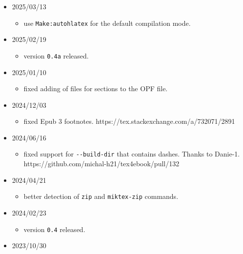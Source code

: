 \begin{itemize}
  \begin{itemize}
  \tightlist
  \item
    redefine \texttt{\textbackslash{}title} and
    \texttt{\textbackslash{}author} after the document class is loaded.
    https://github.com/michal-h21/tex4ebook/issues/138
  \end{itemize}
\item
  2025/03/13

  \begin{itemize}
  \tightlist
  \item
    use \texttt{Make:autohlatex} for the default compilation mode.
  \end{itemize}
\item
  2025/02/19

  \begin{itemize}
  \tightlist
  \item
    version \texttt{0.4a} released.
  \end{itemize}
\item
  2025/01/10

  \begin{itemize}
  \tightlist
  \item
    fixed adding of files for sections to the OPF file.
  \end{itemize}
\item
  2024/12/03

  \begin{itemize}
  \tightlist
  \item
    fixed Epub 3 footnotes. https://tex.stackexchange.com/a/732071/2891
  \end{itemize}
\item
  2024/06/16

  \begin{itemize}
  \tightlist
  \item
    fixed support for \texttt{-\/-build-dir} that contains dashes.
    Thanks to Danie-1. https://github.com/michal-h21/tex4ebook/pull/132
  \end{itemize}
\item
  2024/04/21

  \begin{itemize}
  \tightlist
  \item
    better detection of \texttt{zip} and \texttt{miktex-zip} commands.
  \end{itemize}
\item
  2024/02/23

  \begin{itemize}
  \tightlist
  \item
    version \texttt{0.4} released.
  \end{itemize}
\item
  2023/10/30


\end{itemize}
